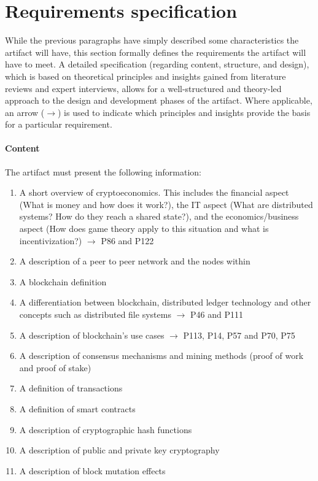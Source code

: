 \section{Requirements specification} \label{sec:ReqSpec}
While the previous paragraphs have simply described some characteristics the artifact will have, this section formally defines the requirements the artifact will have to meet. A detailed specification (regarding content, structure, and design), which is based on theoretical principles and insights gained from literature reviews and expert interviews, allows for a well-structured and theory-led approach to the design and development phases of the artifact. Where applicable, an arrow ($\rightarrow$) is used to indicate which principles and insights provide the basis for a particular requirement.

\paragraph{Content} The artifact must present the following information: 
\begin{enumerate}[nosep]
    \item A short overview of cryptoeconomics. This includes the financial aspect (What is money and how does it work?), the \ac{IT} aspect (What are distributed systems? How do they reach a shared state?), and the economics/business aspect (How does game theory apply to this situation and what is incentivization?) $\rightarrow$ \cite{RalphBeckmann_Interview} P86 and P122
    \item A description of a peer to peer network and the nodes within
    \item A blockchain definition 
    \item A differentiation between blockchain, distributed ledger technology and other concepts such as distributed file systems $\rightarrow$ \cite{DanielKaltenbach_Interview} P46 and \cite{RalphBeckmann_Interview} P111
    \item A description of blockchain's use cases $\rightarrow$ \cite{RalphBeckmann_Interview} P113, \cite{DanielKaltenbach_Interview} P14, P57 and \cite{BjoernPaulewicz_Interview} P70, P75
    \item A description of consensus mechanisms and mining methods (proof of work and proof of stake)
    \item A definition of transactions
    \item A definition of smart contracts
    \item A description of cryptographic hash functions
    \item A description of public and private key cryptography
    \item A description of block mutation effects
\setcounter{foo}{\value{enumi}}
\end{enumerate}

